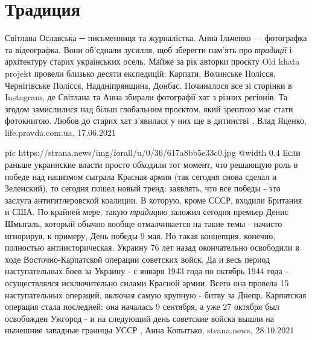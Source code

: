  
 
 
 
 
\chapter{Традиция}
\label{sec:slova.tradicia}

Світлана Ославська ─ письменниця та журналістка. Анна Ільченко — фотографка та
відеографка. Вони об’єднали зусилля, щоб зберегти пам’ять про \emph{традиції} і
архітектуру старих українських осель.  Майже за рік авторки проєкту Old khata
projekt провели близько десяти експедицій: Карпати, Волинське Полісся,
Чернігівське Полісся, Наддніпрянщина, Донбас.  Починалося все зі сторінки в
Instagram, де Світлана та Анна збирали фотографії хат з різних регіонів. Та
згодом замислилися над більш глобальним проєктом, який зрештою має стати
фотокнигою. Любов до старих хат з’явилася у них ще в дитинстві
, 
Влад Яценко, life.pravda.com.ua, 17.06.2021

\ifcmt
  pic https://strana.news/img/forall/u/0/36/617a8bb5e33c0.jpg
  @width 0.4
\fi
Если раньше украинские власти просто обходили тот момент, что решающую роль в
победе над нацизмом сыграла Красная армия (так сегодня снова сделал и
Зеленский), то сегодня пошел новый тренд: заявлять, что все победы - это
заслуга антигитлеровской коалиции. В которую, кроме СССР, входили Британия и
США.  По крайней мере, такую \emph{традицию} заложил сегодня премьер Денис Шмыгаль,
который обычно вообще отмалчивается на такие темы - начисто игнорируя, к
примеру, День победы 9 мая.  Но такая концепция, конечно, полностью
антиисторическая. Украину 76 лет назад окончательно освободили в ходе
Восточно-Карпатской операции советских войск. Да и весь период наступательных
боев за Украину - с января 1943 года по октябрь 1944 года - осуществлялся
исключительно силами Красной армии.  Всего она провела 15 наступательных
операций, включая самую крупную - битву за Днепр. Карпатская операция стала
последней: она началась 9 сентября, а уже 27 октября был освобожден Ужгород - и
на следующий день советские войска вышли на нынешние западные границы УССР
, 
Анна Копытько, strana.news, 28.10.2021
